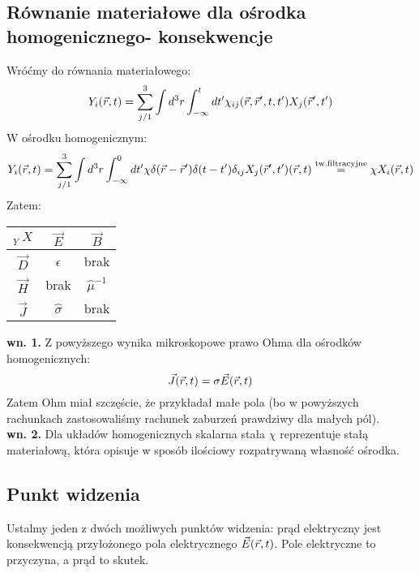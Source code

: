 \subsection{Równanie materiałowe dla ośrodka homogenicznego- konsekwencje}
Wróćmy do równania materiałowego:
\begin{equation} {Y}_i(\vec{r},t)=\sum_{j/1}^3 \int d^3r \int_{-\infty}^t dt' {\chi}_{ij}(\vec{r},\vec{r}',t,t') X_j(\vec{r}',t') \end{equation}
W ośrodku homogenicznym:
\begin{equation} {Y}_i(\vec{r},t)=\sum_{j/1}^3 \int d^3r \int_{-\infty}^0 dt' {\chi}\delta(\vec{r}-\vec{r}')\delta(t-t')\delta_{ij} X_j(\vec{r}',t')(\vec{r},t) 
\stackrel{\text{tw.filtracyjne}}{=}\chi X_i(\vec{r},t) \end{equation}
Zatem:\\
\begin{center}
\begin{tabular}{|c||c|c|}
  \hline
 ${_Y^~~X}$ & $\vec{E}$ & $\vec{B}$\\
  \hline\hline
  $\vec{D}$ &  $\hat{\epsilon}$ & brak \\
\hline
  $\vec{H}$ &  brak & $\hat{\mu}^{-1}$ \\
  \hline
  $\vec{J}$ &  $\hat{\sigma}$ &  brak\\
    \hline
\end{tabular} 
\end{center}
\textbf{wn. 1.} Z powyższego wynika mikroskopowe prawo Ohma dla ośrodków homogenicznych: \begin{equation} \vec{J}(\vec{r},t)=\sigma\vec{E}(\vec{r},t) \end{equation}
Zatem Ohm miał szczęście, że przykładał małe pola (bo w powyższych rachunkach zastosowaliśmy rachunek zaburzeń prawdziwy dla małych pól).\\
\textbf{wn. 2.} Dla układów homogenicznych skalarna stała $\chi$ reprezentuje stałą materiałową, która opisuje w sposób ilościowy rozpatrywaną własność ośrodka.
\subsection{Punkt widzenia}
Ustalmy jeden z dwóch możliwych punktów widzenia:
prąd elektryczny jest konsekwencją przyłożonego pola elektrycznego $\vec{E}(\vec{r},t)$. Pole elektryczne to przyczyna, a prąd to skutek.
